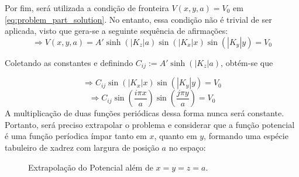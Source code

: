 \documentclass{report}
\begin{document}
Por fim, será utilizada a condição de fronteira $ V(x, y, a) = V_0 $ em \ref{eq:problem_part_solution}.
No entanto, essa condição não é trivial de ser aplicada, visto que gera-se
a seguinte sequência de afirmações:
$$ \Rightarrow V(x, y, a) = A'\sinh(|K_z|a)\sin(|K_x|x)\sin(|K_y|y) = V_0 $$

Coletando as constantes e definindo $ C_{ij} := A'\sinh(|K_z|a) $, obtém-se que

$$ \Rightarrow C_{ij}\sin(|K_x|x)\sin(|K_y|y) = V_0 $$
$$ \Rightarrow C_{ij}\sin\left(\frac{i\pi x}{a}\right)\sin\left(\frac{j\pi y}{a}\right) = V_0 $$
\clearpage
A multiplicação de duas funções periódicas dessa forma nunca será constante. Portanto, será
preciso extrapolar o problema e considerar que a função potencial é uma função períodica ímpar tanto em
$ x $, quanto em $ y $, formando uma espécie tabuleiro de xadrez com largura de posição $ a $ no espaço:

\begin{figure}[!h]
    \centering
    \caption{\label{plot:potencial_ext} Extrapolação do Potencial além de $ x = y = z = a $.}
\end{figure}
\end{document}
